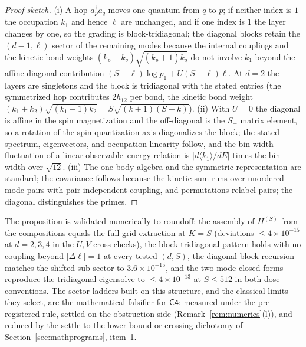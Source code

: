 \begin{proof}[Proof sketch]
(i) A hop $a_p^{\dagger}a_q$ moves one quantum from $q$ to $p$; if neither
index is $1$ the occupation $k_{1}$ and hence $\ell$ are unchanged, and if
one index is $1$ the layer changes by one, so the grading is
block-tridiagonal; the diagonal blocks retain the $(d-1,\ell)$ sector of the
remaining modes because the internal couplings and the kinetic bond weights
$(k_p+k_q)\sqrt{(k_p+1)k_q}$ do not involve $k_1$ beyond the affine diagonal
contribution $(S-\ell)\log p_{1}+U(S-\ell)\ell$. At $d=2$ the layers are
singletons and the block is tridiagonal with the stated entries (the
symmetrized hop contributes $2h_{12}$ per bond, the kinetic bond weight
$(k_1+k_2)\sqrt{(k_1+1)k_2}=S\sqrt{(k+1)(S-k)}$). (ii) With $U=0$ the
diagonal is affine in the spin magnetization and the off-diagonal is the
$S_{+}$ matrix element, so a rotation of the spin quantization axis
diagonalizes the block; the stated spectrum, eigenvectors, and occupation
linearity follow, and the bin-width fluctuation of a linear
observable--energy relation is $|d\langle k_1\rangle/dE|$ times the bin
width over $\sqrt{12}$. (iii) The one-body algebra and the symmetric
representation are standard; the covariance follows because the kinetic sum
runs over unordered mode pairs with pair-independent coupling, and
permutations relabel pairs; the diagonal distinguishes the primes.
\end{proof}

The proposition is validated numerically to roundoff: the assembly of
$H^{(S)}$ from the compositions equals the full-grid extraction at
$K=S$ (deviations $\leq4\times10^{-15}$ at $d=2,3,4$ in the $U,V$
cross-checks), the block-tridiagonal pattern holds with no coupling beyond
$|\Delta\ell|=1$ at every tested $(d,S)$, the diagonal-block recursion
matches the shifted sub-sector to $3.6\times10^{-15}$, and the two-mode
closed forms reproduce the tridiagonal eigensolve to
$\leq4\times10^{-13}$ at $S\le512$ in both dose conventions. The sector
ladders built on this structure, and the classical limits they select, are the
mathematical falsifier for $\mathsf{C4}$: measured under the pre-registered rule,
settled on the obstruction side (Remark~\ref{rem:numerics}(l)), and reduced by the
settle to the lower-bound-or-crossing dichotomy of
Section~\ref{sec:mathprograms}, item~1.

